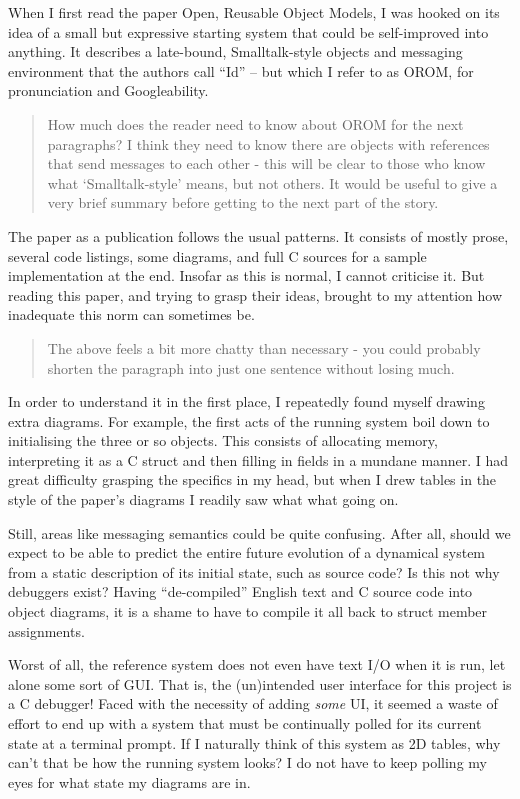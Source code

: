 \documentclass[english,submission]{programming}
\begin{document}
When I first read the paper Open, Reusable Object Models, I was hooked
on its idea of a small but expressive starting system that could be
self-improved into anything. It describes a late-bound, Smalltalk-style
objects and messaging environment that the authors call ``Id'' -- but
which I refer to as OROM, for pronunciation and Googleability.

\begin{quote}
How much does the reader need to know about OROM for the next
paragraphs? I think they need to know there are objects with references
that send messages to each other - this will be clear to those who know
what `Smalltalk-style' means, but not others. It would be useful to give
a very brief summary before getting to the next part of the story.
\end{quote}

The paper as a publication follows the usual patterns. It consists of
mostly prose, several code listings, some diagrams, and full C sources
for a sample implementation at the end. Insofar as this is normal, I
cannot criticise it. But reading this paper, and trying to grasp their
ideas, brought to my attention how inadequate this norm can sometimes
be.

\begin{quote}
The above feels a bit more chatty than necessary - you could probably
shorten the paragraph into just one sentence without losing much.
\end{quote}

In order to understand it in the first place, I repeatedly found myself
drawing extra diagrams. For example, the first acts of the running
system boil down to initialising the three or so objects. This consists
of allocating memory, interpreting it as a C struct and then filling in
fields in a mundane manner. I had great difficulty grasping the
specifics in my head, but when I drew tables in the style of the paper's
diagrams I readily saw what what going on.

Still, areas like messaging semantics could be quite confusing. After
all, should we expect to be able to predict the entire future evolution
of a dynamical system from a static description of its initial state,
such as source code? Is this not why debuggers exist? Having
``de-compiled'' English text and C source code into object diagrams, it
is a shame to have to compile it all back to struct member assignments.

Worst of all, the reference system does not even have text I/O when it
is run, let alone some sort of GUI. That is, the (un)intended user
interface for this project is a C debugger! Faced with the necessity of
adding \emph{some} UI, it seemed a waste of effort to end up with a
system that must be continually polled for its current state at a
terminal prompt. If I naturally think of this system as 2D tables, why
can't that be how the running system looks? I do not have to keep
polling my eyes for what state my diagrams are in.
\end{document}

